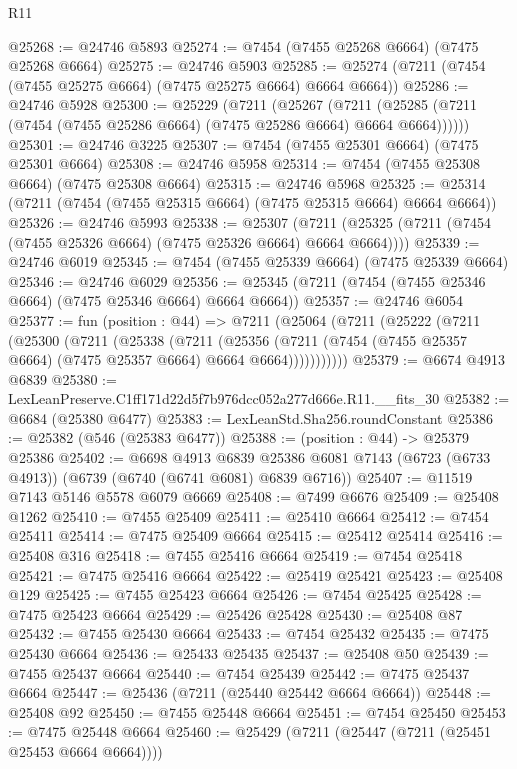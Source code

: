 \begin{lexlean}{R11}
\begin{coremodule}
@25268 := @24746 @5893
@25274 := @7454 (@7455 @25268 @6664) (@7475 @25268 @6664)
@25275 := @24746 @5903
@25285 := @25274 (@7211 (@7454 (@7455 @25275 @6664) (@7475 @25275 @6664) @6664 @6664))
@25286 := @24746 @5928
@25300 := @25229
    (@7211
      (@25267
        (@7211 (@25285 (@7211 (@7454 (@7455 @25286 @6664) (@7475 @25286 @6664) @6664 @6664))))))
@25301 := @24746 @3225
@25307 := @7454 (@7455 @25301 @6664) (@7475 @25301 @6664)
@25308 := @24746 @5958
@25314 := @7454 (@7455 @25308 @6664) (@7475 @25308 @6664)
@25315 := @24746 @5968
@25325 := @25314 (@7211 (@7454 (@7455 @25315 @6664) (@7475 @25315 @6664) @6664 @6664))
@25326 := @24746 @5993
@25338 := @25307
    (@7211 (@25325 (@7211 (@7454 (@7455 @25326 @6664) (@7475 @25326 @6664) @6664 @6664))))
@25339 := @24746 @6019
@25345 := @7454 (@7455 @25339 @6664) (@7475 @25339 @6664)
@25346 := @24746 @6029
@25356 := @25345 (@7211 (@7454 (@7455 @25346 @6664) (@7475 @25346 @6664) @6664 @6664))
@25357 := @24746 @6054
@25377 := fun (position : @44) =>
  @7211
    (@25064
      (@7211
        (@25222
          (@7211
            (@25300
              (@7211
                (@25338
                  (@7211
                    (@25356
                      (@7211 (@7454 (@7455 @25357 @6664) (@7475 @25357 @6664) @6664 @6664)))))))))))
@25379 := @6674 @4913 @6839
@25380 := LexLeanPreserve.C1ff171d22d5f7b976dcc052a277d666e.R11.__fits_30
@25382 := @6684 (@25380 @6477)
@25383 := LexLeanStd.Sha256.roundConstant
@25386 := @25382 (@546 (@25383 @6477))
@25388 := (position : @44) -> @25379 @25386
@25402 := @6698
    @4913
    @6839
    @25386
    @6081
    @7143
    (@6723 (@6733 @4913))
    (@6739 (@6740 (@6741 @6081) @6839 @6716))
@25407 := @11519 @7143 @5146 @5578 @6079 @6669
@25408 := @7499 @6676
@25409 := @25408 @1262
@25410 := @7455 @25409
@25411 := @25410 @6664
@25412 := @7454 @25411
@25414 := @7475 @25409 @6664
@25415 := @25412 @25414
@25416 := @25408 @316
@25418 := @7455 @25416 @6664
@25419 := @7454 @25418
@25421 := @7475 @25416 @6664
@25422 := @25419 @25421
@25423 := @25408 @129
@25425 := @7455 @25423 @6664
@25426 := @7454 @25425
@25428 := @7475 @25423 @6664
@25429 := @25426 @25428
@25430 := @25408 @87
@25432 := @7455 @25430 @6664
@25433 := @7454 @25432
@25435 := @7475 @25430 @6664
@25436 := @25433 @25435
@25437 := @25408 @50
@25439 := @7455 @25437 @6664
@25440 := @7454 @25439
@25442 := @7475 @25437 @6664
@25447 := @25436 (@7211 (@25440 @25442 @6664 @6664))
@25448 := @25408 @92
@25450 := @7455 @25448 @6664
@25451 := @7454 @25450
@25453 := @7475 @25448 @6664
@25460 := @25429 (@7211 (@25447 (@7211 (@25451 @25453 @6664 @6664))))

\end{coremodule}
\end{lexlean}
